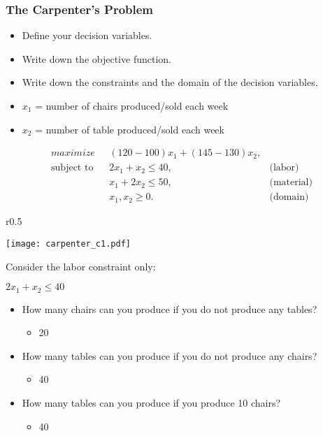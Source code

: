 \documentclass[11pt]{beamer}
\begin{document}
\begin{frame}
\frametitle{The Carpenter’s Problem}
\begin{itemize}
\item Define your decision variables.
\item Write down the objective function.
\item Write down the constraints and the domain of the decision variables.
\end{itemize}
\pause  
\begin{itemize}
\item $x_1$ = number of chairs produced/sold each week
\item $x_2$ = number of table produced/sold each week
\end{itemize}
\pause  
\begin{align}
\displaystyle maximize \mbox{ } & (120-100)x_1 + (145-130)x_2, \label{carpenter:objective} \\
% 
\mbox{subject to }&2 x_1 + x_2  \leq 40, & \mbox{(labor)}  \label{carpenter:labor}\\
&x_1 + 2 x_2  \leq 50, & \mbox{(material)}  \label{carpenter:material}\\
& x_1, x_2 \geq 0. & \mbox{(domain)} \label{carpenter:domain}
\end{align}

\end{frame}

\begin{frame}
\begin{wrapfigure}{r}{0.5\textwidth}
  \vspace{-40pt}
\begin{center}
\texttt{[image: carpenter\_c1.pdf]}
\end{center}
\end{wrapfigure} 
{Consider the labor constraint only: 

$2 x_1 + x_2  \leq 40$
\begin{itemize}
\item How many chairs can you produce if you do not produce any tables?

\begin{itemize}
\item 20
\end{itemize}
\item How many tables can you produce if you do not produce any chairs?

\begin{itemize}
\item 40
\end{itemize}
\item How many tables can you produce if you produce 10 chairs?

\begin{itemize}
\item 40
\end{itemize}
\end{itemize}}
\end{frame}
\end{document}
